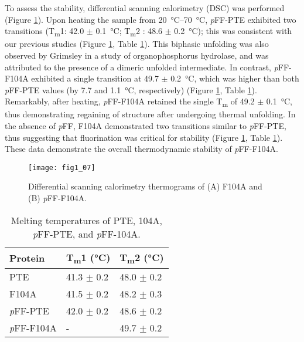 \begin{refsection}
To assess the stability, differential scanning calorimetry (DSC) was performed
(Figure \ref{fig:DSC-fig}). Upon heating the sample from
\SIrange{20}{70}{\celsius}, \emph{p}FF-PTE exhibited two transitions
(T\textsubscript{m}1: 42.0 $\pm$ \SI{0.1}{\celsius}; T\textsubscript{m}2 : 48.6
$\pm$ \SI{0.2}{\celsius}); this was consistent with our previous studies
\cite{Baker2011b} (Figure \ref{fig:DSC-fig}, Table \ref{tab:DSC}). This
biphasic unfolding was also observed by Grimsley   in a study of
organophosphorus hydrolase, and was attributed to the presence of a dimeric
unfolded intermediate\cite{Grimsley1997b}. In contrast, \emph{p}FF-F104A
exhibited a single transition at 49.7 $\pm$ \SI{0.2}{\celsius}, which was
higher than both \emph{p}FF-PTE values (by 7.7 and \SI{1.1}{\celsius},
respectively) (Figure \ref{fig:DSC-fig}, Table \ref{tab:DSC}). Remarkably,
after heating, \emph{p}FF-F104A retained the single T\textsubscript{m} of 49.2
$\pm$ \SI{0.1}{\celsius}, thus demonstrating regaining of structure after
undergoing thermal unfolding.  In the absence of \emph{p}FF, F104A demonstrated
two transitions similar to \emph{p}FF-PTE, thus suggesting that fluorination
was critical for stability (Figure \ref{fig:DSC-fig}, Table \ref{tab:DSC}).
These data demonstrate the overall thermodynamic stability of \emph{p}FF-F104A.
\begin{figure}[h!] \centering \texttt{[image: fig1\_07]}
    \caption[Differential scanning calorimetry thermograms of (A) F104A and (B)
    \emph{p}FF-F104A.]{Differential scanning calorimetry thermograms of (A)
        F104A and (B) \emph{p}FF-F104A.} \label{fig:DSC-fig} 
\end{figure}
\begin{table}[h!]
\centering
\begin{tabular}{ lll }
  \hline
  Protein & T\textsubscript{m}1 (\si{\celsius}) & T\textsubscript{m}2 (\si{\celsius}) \\
  \hline
  PTE & 41.3 $\pm$ 0.2 & 48.0 $\pm$ 0.2 \\
  F104A & 41.5 $\pm$ 0.2 & 48.2 $\pm$ 0.3 \\
  \emph{p}FF-PTE & 42.0 $\pm$ 0.2 & 48.6 $\pm$ 0.2  \\
  \emph{p}FF-F104A & - & 49.7 $\pm$ 0.2  \\
  \hline

\end{tabular}
\caption[Melting temperatures of PTE, 104A, \emph{p}FF-PTE, and
\emph{p}FF-104A]{Melting temperatures of PTE, 104A, \emph{p}FF-PTE, and
\emph{p}FF-104A.} 
    \label{tab:DSC} 
\end{table}


\end{refsection}
